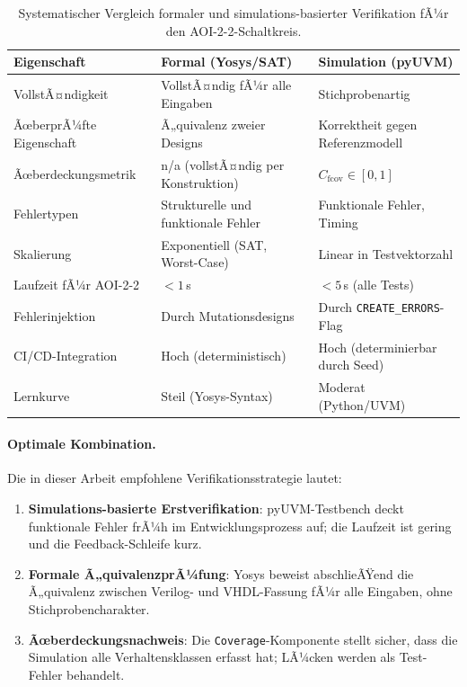 ﻿\documentclass[12pt,a4paper]{report}
\begin{document}
\begin{table}[H]
\centering
\small
\begin{tabular}{|l|p{3.8cm}|p{3.8cm}|}
\hline
\textbf{Eigenschaft} & \textbf{Formal (Yosys/SAT)} & \textbf{Simulation (pyUVM)} \\
\hline
VollstÃ¤ndigkeit & VollstÃ¤ndig fÃ¼r alle Eingaben & Stichprobenartig \\
ÃœberprÃ¼fte Eigenschaft & Ã„quivalenz zweier Designs & Korrektheit gegen Referenzmodell \\
Ãœberdeckungsmetrik & n/a (vollstÃ¤ndig per Konstruktion) & $C_{\mathrm{fcov}} \in [0,1]$ \\
Fehlertypen & Strukturelle und funktionale Fehler & Funktionale Fehler, Timing \\
Skalierung & Exponentiell (SAT, Worst-Case) & Linear in Testvektorzahl \\
Laufzeit fÃ¼r AOI-2-2 & $< 1\,$s & $< 5\,$s (alle Tests) \\
Fehlerinjektion & Durch Mutationsdesigns & Durch \texttt{CREATE\_ERRORS}-Flag \\
CI/CD-Integration & Hoch (deterministisch) & Hoch (determinierbar durch Seed) \\
Lernkurve & Steil (Yosys-Syntax) & Moderat (Python/UVM) \\
\hline
\end{tabular}
\caption{Systematischer Vergleich formaler und simulations-basierter Verifikation fÃ¼r den AOI-2-2-Schaltkreis.}
\label{tab:sim_formal_vergleich}
\end{table}

\paragraph{Optimale Kombination.}
Die in dieser Arbeit empfohlene Verifikationsstrategie lautet:

\begin{enumerate}
    \item \textbf{Simulations-basierte Erstverifikation}: pyUVM-Testbench
          deckt funktionale Fehler frÃ¼h im Entwicklungsprozess auf; die
          Laufzeit ist gering und die Feedback-Schleife kurz.
    \item \textbf{Formale Ã„quivalenzprÃ¼fung}: Yosys beweist abschlieÃŸend die
          Ã„quivalenz zwischen Verilog- und VHDL-Fassung fÃ¼r alle Eingaben,
          ohne Stichprobencharakter.
    \item \textbf{Ãœberdeckungsnachweis}: Die \texttt{Coverage}-Komponente stellt
          sicher, dass die Simulation alle Verhaltensklassen erfasst hat;
          LÃ¼cken werden als Test-Fehler behandelt.
\end{enumerate}
\end{document}
